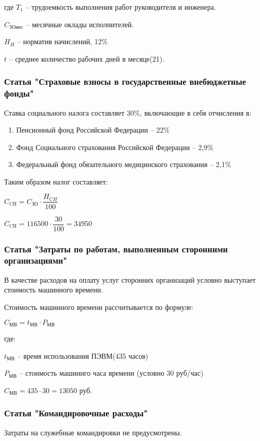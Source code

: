 где $T_{1}$ -- трудоемкость выполнения работ руководителя и инженера.

    $C_{\text{ЗОмес}}$ -- месячные оклады исполнителей.

    $H_{H}$ -- норматив начислений, 12\%

    $t$ -- среднее количество рабочих дней в месяце(21).

\subsubsection*{Статья "Страховые взносы в государственные внебюджетные фонды"}

Ставка социального налога составляет 30\%, включающие в себя отчисления в:

\begin{enumerate}
  \item Пенсионный фонд Российской Федерации -- 22\%
  \item Фонд Социального страхования Российской Федерации -- 2,9\%
  \item Федеральный фонд обязательного медицинского страхования -- 2,1\%

\end{enumerate}
Таким образом налог составляет:

  $C_{\text{CH}} = C_{\text{ЗО}} \cdot \dfrac{H_{CH}}{100}$

  $C_{\text{CH}} = 116500 \cdot \dfrac{30}{100} = 34950$

\subsubsection*{Статья "Затраты по работам, выполненным сторонними организациями"}

В качестве расходов на оплату услуг сторонних организаций условно выступает стоимость машинного времени.

Стоимость машинного времени рассчитывается по формуле:

\begin{center}
$C_{\text{МВ}} = t_{\text{МВ}} \cdot P_{\text{МВ}}$
\end{center}

где:

$t_{\text{МВ}}$ -- время использования ПЭВМ(435 часов)

$P_{\text{МВ}}$ -- стоимость машиннго часа времени (условно 30 руб/час)

$C_{\text{МВ}} = 435 \cdot 30 = 13050$ руб.

\subsubsection*{Статья "Командировочные расходы"}
Затраты на служебные командировки не предусмотрены.

